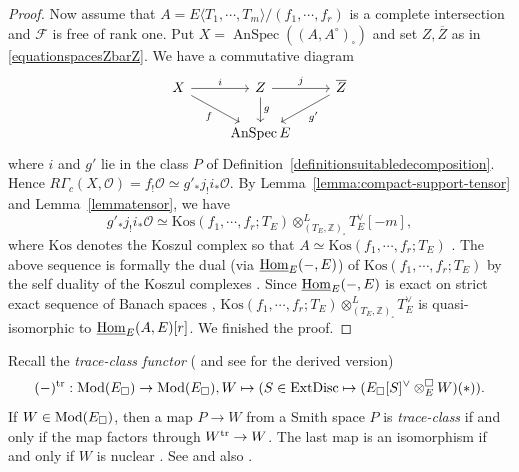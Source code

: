 \documentclass[a4paper,10pt]{amsart}
\theoremstyle{remark}
\theoremstyle{definition}
\theoremstyle{plain}
\numberwithin{equation}{section}
\newcommand{\bbZ}{{\mathbb Z}}
\newcommand{\calF}{{\mathcal F}}
\newcommand{\calO}{{\mathcal O}}
\newcommand{\ovZ}{{\overline Z}}
\newcommand{\Hom}{{\rm Hom}}
\newcommand{\uHom}{\underline{\Hom}}
\newcommand{\Mod}{{\rm Mod}}
\newcommand{\trace}{\mathrm{tr}}
\DeclareMathOperator{\AnSpec}{AnSpec}
\begin{document}
\begin{proof}
	Now assume that $A=E\langle T_1,\cdots,T_m\rangle/(f_1,\cdots,f_r)$ is a complete intersection and $\calF$ is free of rank one. Put $X=\AnSpec((A,A^\circ)_\square)$ and set $Z,\ovZ$ as in \eqref{equationspacesZbarZ}. We have a commutative diagram
	\[
	\begin{tikzcd}
	X
	\arrow[r,"i"]
	\arrow[rd,"f"']
	& Z
	\arrow[r,"j"]
	\arrow[d,"g"]
	& \overline{Z}
	\arrow[ld,"g'"]\\
	& \AnSpec E &
	\end{tikzcd}
	\]
	where $i$ and $g'$ lie in the class $P$ of Definition~\ref{definitionsuitabledecomposition}. Hence $R\Gamma_c(X,\calO)= f_!\calO\simeq g'_*j_!i_*\calO$. By Lemma~\ref{lemma:compact-support-tensor} and Lemma~\ref{lemmatensor}, we have $$g'_*j_!i_*\calO\simeq \mathrm{Kos}(f_1,\cdots,f_r; T_E)\otimes^L_{(T_E,\bbZ)_\square} T_E^{\vee}[-m],$$
	where $\mathrm{Kos}$ denotes the Koszul complex so that $A\simeq \mathrm{Kos}(f_1,\cdots,f_r; T_E)$ \cite[\href{https://stacks.math.columbia.edu/tag/062F}{Tag 062F}]{stacks-project}. The above sequence is formally the dual (via $\uHom_{E}(-,E)$) of $\mathrm{Kos}(f_1,\cdots,f_r; T_E)$ by the self duality of the Koszul complexes \cite[§~A.2, Ch.~IV]{serre1975algebre}. Since $\uHom_{E}(-,E)$ is exact on strict exact sequence of Banach spaces \cite[Prop.~3.5]{rodrigues2022solid}, $ \mathrm{Kos}(f_1,\cdots,f_r; T_E)\otimes^L_{(T_E,\bbZ)_\square} T_E^{\vee}$ is quasi-isomorphic to $\uHom_E(A,E)[r]$. We finished the proof.
\end{proof}
Recall the \emph{trace-class functor} (\cite[Def.~A.46]{bosco2021drinfeldproetale} and see \cite[Def.~A.13]{bosco2023rationalpadicHodge} for the derived version)
\begin{equation}\label{equationdefinitiontraceclassfunctor}
	(-)^{\trace}: \Mod(E_{\square})\rightarrow \Mod(E_{\square}), W\mapsto (S\in \mathrm{ExtDisc}\mapsto (E_{\square}[S]^{\vee}\otimes^{\square}_EW)(*)).
\end{equation}
If $W\in \Mod(E_{\square})$, then a map $P\rightarrow W$ from a Smith space $P$ is \emph{trace-class} if and only if the map factors through $W^{\rm tr}\rightarrow W$. The last map is an isomorphism if and only if $W$ is nuclear \cite[Def.~3.14]{rodrigues2022solid}. See \cite[Lem.~A.47]{bosco2021drinfeldproetale} and also \cite[Lem.~A.14]{bosco2023rationalpadicHodge}.
\end{document}

